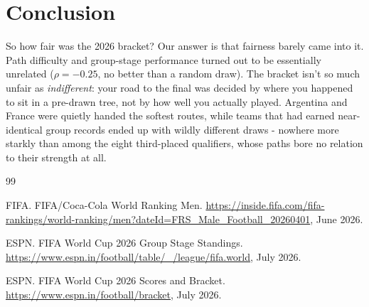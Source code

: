 \documentclass[11pt]{article}
\begin{document}
\section{Conclusion}
\label{sec:conclusion}

So how fair was the 2026 bracket? Our answer is that fairness barely came into it. Path difficulty and group-stage performance turned out to be essentially unrelated ($\rho = -0.25$, no better than a random draw). The bracket isn't so much unfair as \emph{indifferent}: your road to the final was decided by where you happened to sit in a pre-drawn tree, not by how well you actually played. Argentina and France were quietly handed the softest routes, while teams that had earned near-identical group records ended up with wildly different draws - nowhere more starkly than among the eight third-placed qualifiers, whose paths bore no relation to their strength at all.


\begin{thebibliography}{99}

 FIFA. FIFA/Coca-Cola World Ranking Men. \url{https://inside.fifa.com/fifa-rankings/world-ranking/men?dateId=FRS_Male_Football_20260401}, June 2026.

 ESPN. FIFA World Cup 2026 Group Stage Standings. \url{https://www.espn.in/football/table/_/league/fifa.world}, July 2026.

 ESPN. FIFA World Cup 2026 Scores and Bracket. \url{https://www.espn.in/football/bracket}, July 2026.

\end{thebibliography}
\end{document}
